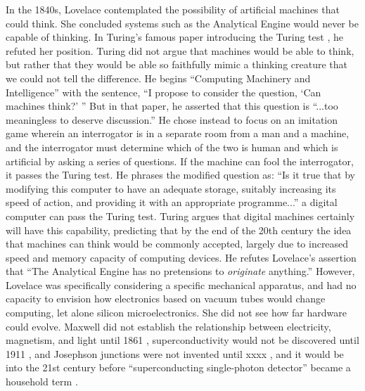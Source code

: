 \documentclass[twocolumn]{article}
\begin{document}
\vspace{3em}
In the 1840s, Lovelace contemplated the possibility of artificial machines that could think. She concluded systems such as the Analytical Engine would never be capable of thinking. In Turing's famous paper introducing the Turing test \cite{tu1950}, he refuted her position. Turing did not argue that machines would be able to think, but rather that they would be able so faithfully mimic a thinking creature that we could not tell the difference. He begins ``Computing Machinery and Intelligence'' with the sentence, ``I propose to consider the question, `Can machines think?' '' But in that paper, he asserted that this question is ``...too meaningless to deserve discussion.'' He chose instead to focus on an imitation game wherein an interrogator is in a separate room from a man and a machine, and the interrogator must determine which of the two is human and which is artificial by asking a series of questions. If the machine can fool the interrogator, it passes the Turing test. He phrases the modified question as: ``Is it true that by modifying this computer to have an adequate storage, suitably increasing its speed of action, and providing it with an appropriate programme...'' a digital computer can pass the Turing test. Turing argues that digital machines certainly will have this capability, predicting that by the end of the 20th century the idea that machines can think would be commonly accepted, largely due to increased speed and memory capacity of computing devices. He refutes Lovelace's assertion that ``The Analytical Engine has no pretensions to \textit{originate} anything.'' However, Lovelace was specifically considering a specific mechanical apparatus, and had no capacity to envision how electronics based on vacuum tubes would change computing, let alone silicon microelectronics. She did not see how far hardware could evolve. Maxwell did not establish the relationship between electricity, magnetism, and light until 1861 \cite{}, superconductivity would not be discovered until 1911 \cite{on1911}, and Josephson junctions were not invented until xxxx \cite{}, and it would be into the 21st century before ``superconducting single-photon detector'' became a household term \cite{}. 
\end{document}
